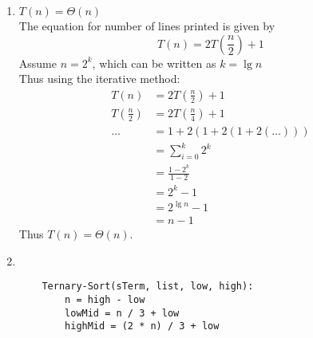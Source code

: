 \documentclass[paper=a4, fontsize=11pt]{scrartcl} %
\numberwithin{equation}{section} %
\numberwithin{figure}{section} %
\numberwithin{table}{section} %
\begin{document}
\begin{enumerate}
    \item $T(n) = \Theta(n)$ \\
    The equation for number of lines printed is given by
    \[ T(n) = 2T\left(\frac{ n }{ 2 }\right) + 1 \]
    Assume $n = 2^k$, which can be written as $k = \lg{n}$ \\
    Thus using the iterative method:
    \begin{align*}
        T(n) & = 2T\left(\frac{ n }{ 2 }\right) + 1 \\
        T\left(\frac{ n }{ 2 }\right) & = 2T\left(\frac{ n }{ 4 }\right) + 1 \\
        \ldots & = 1 + 2(1 + 2(1 + 2(\ldots))) \\
        & = \sum\limits_{i=0}^k 2^k \\
        & = \frac{ 1 - 2^k }{ 1 - 2 } \\
        & = 2^k - 1 \\
        & = 2^{\lg{n}} - 1 \\
        & = n - 1
    \end{align*}
    Thus $T(n) = \Theta(n)$.
    \item \hfill \\
    \begin{verbatim}
    Ternary-Sort(sTerm, list, low, high):
        n = high - low
        lowMid = n / 3 + low
        highMid = (2 * n) / 3 + low


\end{verbatim}
\end{enumerate}
\end{document}
